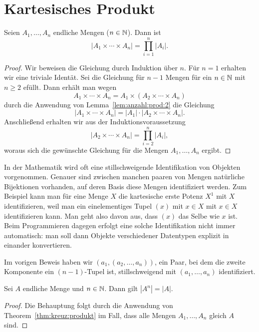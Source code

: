 \section{Kartesisches Produkt} 

\begin{thm} \label{thm:kreuz:produkt}
	Seien $A_1,\ldots, A_n$ endliche Mengen ($n \in \mathbb{N}$). Dann ist 
	\[
		|A_1 \times \cdots \times A_n|  = \prod_{i=1}^n |A_i|. 
	\]
\end{thm} 
\begin{proof}
	Wir beweisen die Gleichung durch Induktion über $n$.
	Für $n=1$ erhalten wir eine triviale Identät. Sei die Gleichung für $n-1$ Mengen für ein $n \in \mathbb{N}$ mit $n \ge 2$ efüllt. Dann erhält man wegen 
	\[
			A_1 \times \cdots \times A_n = A_1 \times (A_2 \times \cdots \times A_n)
	\]
	durch die Anwendung von Lemma~\ref{lem:anzahl:prod:2} die Gleichung 
	\[
		|A_1 \times \cdots \times A_n | = |A_1| \cdot |A_2 \times \cdots \times A_n|. 
	\]
	Anschließend erhalten wir aus der Induktionsvoraussetzung 
	\[
		|A_2 \times \cdots \times A_n| = \prod_{i=2}^n |A_i|,
	\]
	woraus sich die gewünschte Gleichung für die Mengen $A_1,\ldots,A_n$ ergibt. 
\end{proof} 

\begin{bem}
	In der Mathematik wird oft eine stillschweigende Identifikation von Objekten vorgenommen. Genauer sind  zwischen manchen paaren von Mengen natürliche Bijektionen vorhanden, auf deren Basis diese Mengen identifiziert werden. Zum Beispiel kann man für eine Menge $X$ die kartesische erste Potenz $X^1$ mit $X$ identifizieren, weil man ein einelementiges Tupel $(x)$ mit $x \in X$ mit $x \in X$ identifizieren kann. Man geht also davon aus, dass $(x)$ das Selbe wie $x$ ist. Beim Programmieren dagegen erfolgt eine solche Identifikation nicht immer automatisch: man soll dann Objekte verschiedener Datentypen explizit in einander konvertieren. 
	
	Im vorigen Beweis haben wir $(a_1,(a_2,\ldots,a_n))$, ein Paar, bei dem die zweite Komponente ein $(n-1)$-Tupel ist, stillschweigend mit $(a_1,\ldots,a_n)$ identifiziert. 
\end{bem} 

\begin{kor} \label{kor:product} 
	Sei $A$ endliche Menge und $n \in \mathbb{N}$. Dann gilt $|A^n| = |A|$. 
\end{kor}
\begin{proof}
	Die Behauptung folgt durch die Anwendung von Theorem~\ref{thm:kreuz:produkt} im Fall, dass alle Mengen $A_1,\ldots,A_n$ gleich $A$ sind. 
\end{proof}  

